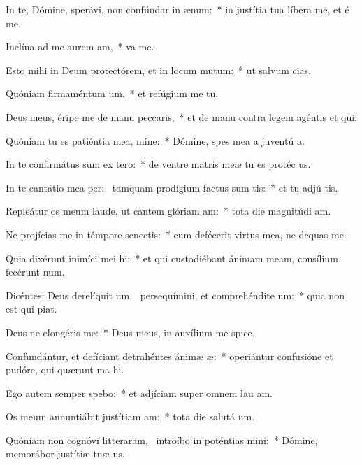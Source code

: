 \item In te, Dómine, sperávi, non confúndar in ænum:~* in justítia tua líbera me, et é me.
\item Inclína ad me aurem am,~*  va me.
\item Esto mihi in Deum protectórem, et in locum mutum:~* ut salvum  cias.
\item Quóniam firmaméntum um,~* et refúgium me  tu.
\item Deus meus, éripe me de manu peccaris,~* et de manu contra legem agéntis et qui:
\item Quóniam tu es patiéntia mea, mine:~* Dómine, spes mea a juventú a.
\item In te confirmátus sum ex tero:~* de ventre matris meæ tu es protéc us.
\item In te cantátio mea per:~\pscross{} tamquam prodígium factus sum tis:~* et tu adjú tis.
\item Repleátur os meum laude, ut cantem glóriam am:~* tota die magnitúdi am.
\item Ne projícias me in témpore senectis:~* cum defécerit virtus mea, ne dequas me.
\item Quia dixérunt inimíci mei hi:~* et qui custodiébant ánimam meam, consílium fecérunt  num.
\item Dicéntes: Deus derelíquit um,~\pscross{} persequímini, et comprehéndite um:~* quia non est qui piat.
\item Deus ne elongéris  me:~* Deus meus, in auxílium me spice.
\item Confundántur, et defíciant detrahéntes ánimæ æ:~* operiántur confusióne et pudóre, qui quærunt ma hi.
\item Ego autem semper spebo:~* et adjíciam super omnem lau am.
\item Os meum annuntiábit justítiam am:~* tota die salutá um.
\item Quóniam non cognóvi litteraram,~\pscross{} introíbo in poténtias mini:~* Dómine, memorábor justítiæ tuæ us.
